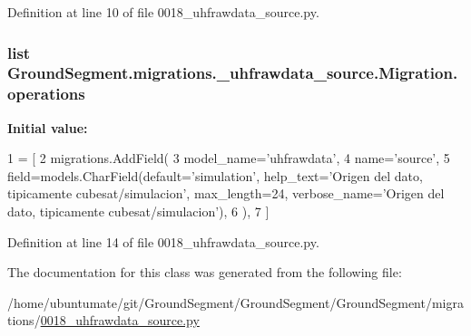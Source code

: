 Definition at line 10 of file 0018\+\_\+uhfrawdata\+\_\+source.\+py.

\hypertarget{class_ground_segment_1_1migrations_1_10018__uhfrawdata__source_1_1_migration_a15d7ce4696e8007f9c283fbb33bd103d}{}
\subsubsection[{operations}]{\setlength{\rightskip}{0pt plus 5cm}list Ground\+Segment.\+migrations.\+\_\+uhfrawdata\+\_\+source.\+Migration.\+operations\hspace{0.3cm}{\ttfamily [static]}}\label{class_ground_segment_1_1migrations_1_10018__uhfrawdata__source_1_1_migration_a15d7ce4696e8007f9c283fbb33bd103d}
{\bfseries Initial value\+:}
\begin{DoxyCode}
1 = [
2         migrations.AddField(
3             model\_name=\textcolor{stringliteral}{'uhfrawdata'},
4             name=\textcolor{stringliteral}{'source'},
5             field=models.CharField(default=\textcolor{stringliteral}{'simulation'}, help\_text=\textcolor{stringliteral}{'Origen del dato, tipicamente
       cubesat/simulacion'}, max\_length=24, verbose\_name=\textcolor{stringliteral}{'Origen del dato, tipicamente cubesat/simulacion'}),
6         ),
7     ]
\end{DoxyCode}


Definition at line 14 of file 0018\+\_\+uhfrawdata\+\_\+source.\+py.



The documentation for this class was generated from the following file\+:\begin{DoxyCompactItemize}
\item 
/home/ubuntumate/git/\+Ground\+Segment/\+Ground\+Segment/\+Ground\+Segment/migrations/\hyperlink{0018__uhfrawdata__source_8py}{0018\+\_\+uhfrawdata\+\_\+source.\+py}\end{DoxyCompactItemize}
